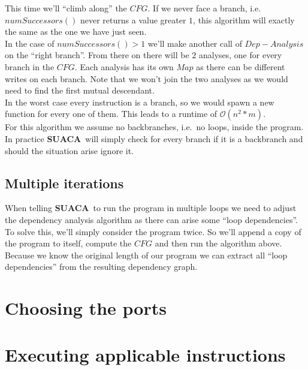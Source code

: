 \documentclass[a4paper,12pt,titlepage, twoside]{report}
\newcommand{\suaca}{\textbf{SUACA}}
\begin{document}
This time we'll ``climb along'' the $CFG$. If we never face a branch, i.e.\ $numSuccessors()$ never returns a value greater $1$, this algorithm will exactly the same as the one we have just seen.\\
In the case of $numSuccessors() > 1$ we'll make another call of $Dep-Analysis$ on the ``right branch''. From there on there will be $2$ analyses, one for every branch in the $CFG$. Each analysis has its own $Map$ as there can be different writes on each branch. Note that we won't join the two analyses as we would need to find the first mutual descendant.\\

In the worst case every instruction is a branch, so we would spawn a new function for every one of them. This leads to a runtime of $\mathcal{O}(n^2*m)$.\\

For this algorithm we assume no backbranches, i.e.\ no loops, inside the program. In practice \suaca\ will simply check for every branch if it is a backbranch and should the situation arise ignore it.


\subsection{Multiple iterations}

When telling \suaca\ to run the program in multiple loops we need to adjust the dependency analysis algorithm as there can arise some ``loop dependencies''. To solve this, we'll simply consider the program twice. So we'll append a copy of the program to itself, compute the $CFG$ and then run the algorithm above. Because we know the original length of our program we can extract all ``loop dependencies'' from the resulting dependency graph.

\section{Choosing the ports}

\section{Executing applicable instructions}


{\small }
\end{document}
